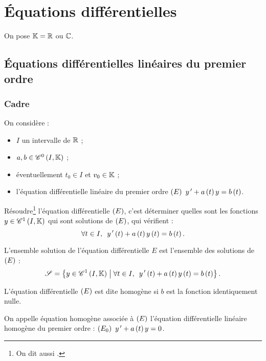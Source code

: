 \chapter{Équations différentielles}\label{chap:équationsDifférentielles}

\minitoc

On pose \(\mathbb{K}=\mathbb{R}\) ou \(\mathbb{C}\).

\section{Équations différentielles linéaires du premier ordre}

\subsection{Cadre}

On considère :

\begin{itemize}
\item \(I\) un intervalle de \(\mathbb{R}\) ; \\

\item \(a,b\in\mathscr{C}^{0}\left(I,\mathbb{K}\right)\) ; \\

\item éventuellement \(t_0\in I\) et \(v_0\in\mathbb{K}\) ; \\

\item l'équation différentielle linéaire du premier ordre \(\left(E\right)~y^{\,\prime}+a\left(t\right)y=b\left(t\right)\).
\end{itemize}

Résoudre\footnote{On dit aussi .} l'équation différentielle \(\left(E\right)\), c'est déterminer quelles sont les fonctions \(y\in\mathscr{C}^{1}\left(I,\mathbb{K}\right)\) qui sont solutions de \(\left(E\right)\), \cad qui vérifient : \[\quantifs{\forall t\in I}y\prim\paren{t}+a\paren{t}y\paren{t}=b\paren{t}.\]

L'ensemble solution de l'équation différentielle \(E\) est l'ensemble des solutions de \(\left(E\right)\) : \[\fami{S}=\accol{y\in\ensclasse{1}{I}{\K}\tq\quantifs{\forall t\in I}y\prim\paren{t}+a\paren{t}y\paren{t}=b\paren{t}}.\]

L'équation différentielle \(\left(E\right)\) est dite homogène si \(b\) est la fonction identiquement nulle.

On appelle équation homogène associée à \(\left(E\right)\) l'équation différentielle linéaire homogène du premier ordre : \(\left(E_0\right)~y^{\,\prime}+a\left(t\right)y=0\).

